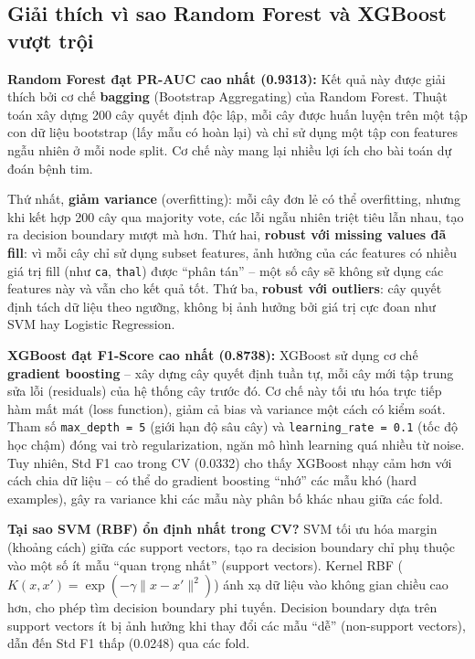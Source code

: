 \subsection{Giải thích vì sao Random Forest và XGBoost vượt trội}

\textbf{Random Forest đạt PR-AUC cao nhất (0.9313):} Kết quả này được giải thích bởi cơ chế \textbf{bagging} (Bootstrap Aggregating) của Random Forest. Thuật toán xây dựng 200 cây quyết định độc lập, mỗi cây được huấn luyện trên một tập con dữ liệu bootstrap (lấy mẫu có hoàn lại) và chỉ sử dụng một tập con features ngẫu nhiên ở mỗi node split. Cơ chế này mang lại nhiều lợi ích cho bài toán dự đoán bệnh tim.

Thứ nhất, \textbf{giảm variance} (overfitting): mỗi cây đơn lẻ có thể overfitting, nhưng khi kết hợp 200 cây qua majority vote, các lỗi ngẫu nhiên triệt tiêu lẫn nhau, tạo ra decision boundary mượt mà hơn. Thứ hai, \textbf{robust với missing values đã fill}: vì mỗi cây chỉ sử dụng subset features, ảnh hưởng của các features có nhiều giá trị fill (như \texttt{ca}, \texttt{thal}) được ``phân tán'' -- một số cây sẽ không sử dụng các features này và vẫn cho kết quả tốt. Thứ ba, \textbf{robust với outliers}: cây quyết định tách dữ liệu theo ngưỡng, không bị ảnh hưởng bởi giá trị cực đoan như SVM hay Logistic Regression.

\textbf{XGBoost đạt F1-Score cao nhất (0.8738):} XGBoost sử dụng cơ chế \textbf{gradient boosting} -- xây dựng cây quyết định tuần tự, mỗi cây mới tập trung sửa lỗi (residuals) của hệ thống cây trước đó. Cơ chế này tối ưu hóa trực tiếp hàm mất mát (loss function), giảm cả bias và variance một cách có kiểm soát. Tham số \texttt{max\_depth = 5} (giới hạn độ sâu cây) và \texttt{learning\_rate = 0.1} (tốc độ học chậm) đóng vai trò regularization, ngăn mô hình learning quá nhiều từ noise. Tuy nhiên, Std F1 cao trong CV (0.0332) cho thấy XGBoost nhạy cảm hơn với cách chia dữ liệu -- có thể do gradient boosting ``nhớ'' các mẫu khó (hard examples), gây ra variance khi các mẫu này phân bố khác nhau giữa các fold.

\textbf{Tại sao SVM (RBF) ổn định nhất trong CV?} SVM tối ưu hóa margin (khoảng cách) giữa các support vectors, tạo ra decision boundary chỉ phụ thuộc vào một số ít mẫu ``quan trọng nhất'' (support vectors). Kernel RBF ($K(x, x') = \exp(-\gamma \lVert x-x' \rVert^2)$) ánh xạ dữ liệu vào không gian chiều cao hơn, cho phép tìm decision boundary phi tuyến. Decision boundary dựa trên support vectors ít bị ảnh hưởng khi thay đổi các mẫu ``dễ'' (non-support vectors), dẫn đến Std F1 thấp (0.0248) qua các fold.

